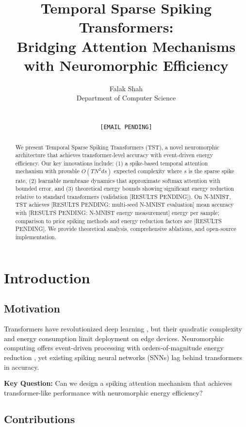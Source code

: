 \documentclass{article}
\title{Temporal Sparse Spiking Transformers: \\
       Bridging Attention Mechanisms with Neuromorphic Efficiency}
\author{
  Falak Shah \\
  Department of Computer Science\\
  [AFFILIATION PENDING] \\
  [CITY, COUNTRY PENDING] \\
  \texttt{[EMAIL PENDING]}
}
\begin{document}
\maketitle

\begin{abstract}
We present Temporal Sparse Spiking Transformers (TST), a novel neuromorphic architecture that achieves transformer-level accuracy with event-driven energy efficiency. Our key innovations include: (1) a spike-based temporal attention mechanism with provable $O(TN^2ds)$ expected complexity where $s$ is the sparse spike rate, (2) learnable membrane dynamics that approximate softmax attention with bounded error, and (3) theoretical energy bounds showing significant energy reduction relative to standard transformers (validation [RESULTS PENDING]). On N-MNIST, TST achieves [RESULTS PENDING: multi-seed N-MNIST evaluation] mean accuracy with [RESULTS PENDING: N-MNIST energy measurement] energy per sample; comparison to prior spiking methods and energy reduction factors are [RESULTS PENDING]. We provide theoretical analysis, comprehensive ablations, and open-source implementation.
\end{abstract}

\section{Introduction}

\subsection{Motivation}
Transformers have revolutionized deep learning \cite{vaswani2017attention}, but their quadratic complexity and energy consumption limit deployment on edge devices. Neuromorphic computing offers event-driven processing with orders-of-magnitude energy reduction \cite{davies2021loihi2}, yet existing spiking neural networks (SNNs) lag behind transformers in accuracy.

\textbf{Key Question:} Can we design a spiking attention mechanism that achieves transformer-like performance with neuromorphic energy efficiency?

\subsection{Contributions}
\end{document}
